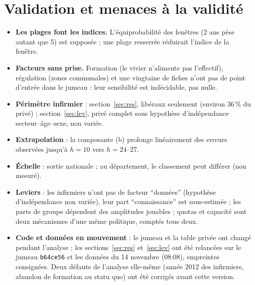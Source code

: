 \documentclass[11pt]{article}
\begin{document}
\section{Validation et menaces à la validité}
\begin{itemize}
  \item \textbf{Les plages font les indices.} L'équiprobabilité des fenêtres (2 ans pèse autant que 5) est
        supposée ; une plage resserrée réduirait l'indice de la fenêtre.
  \item \textbf{Facteurs sans prise.} Formation (le vivier n'alimente pas l'effectif), régulation (zones
        communales) et une vingtaine de fiches n'ont pas de point d'entrée dans le jumeau : leur sensibilité est
        indécidable, pas nulle.
  \item \textbf{Périmètre infirmier} : section~\ref{sec:res}, libéraux seulement (environ 36\,\%\derive{} du privé) ;
        section~\ref{sec:lev}, privé complet sous hypothèse d'indépendance secteur--âge--sexe, non variée.
  \item \textbf{Extrapolation} : la composante (b) prolonge linéairement des erreurs observées jusqu'à $h = 10$
        vers $h = 24$--27.
  \item \textbf{Échelle} : sortie nationale ; au département, le classement peut différer (non mesuré).
  \item \textbf{Leviers} : les infirmiers n'ont pas de facteur \enquote{données} (hypothèse d'indépendance non variée),
        leur part \enquote{connaissance} est sous-estimée ; les parts de groupe dépendent des amplitudes jouables ;
        quotas et capacité sont deux mécanismes d'une même politique, comptés tous deux.
  \item \textbf{Code et données en mouvement} : le jumeau et la table privée ont changé pendant l'analyse ; les
        sections~\ref{sec:res} et~\ref{sec:lev} ont été relancées sur le jumeau \texttt{b64ce56} et les données
        du 14 novembre (08:08), empreintes consignées. Deux défauts de l'analyse elle-même (année 2012 des
        infirmiers, abandon de formation au statu quo) ont été corrigés avant cette version.
\end{itemize}
\end{document}
